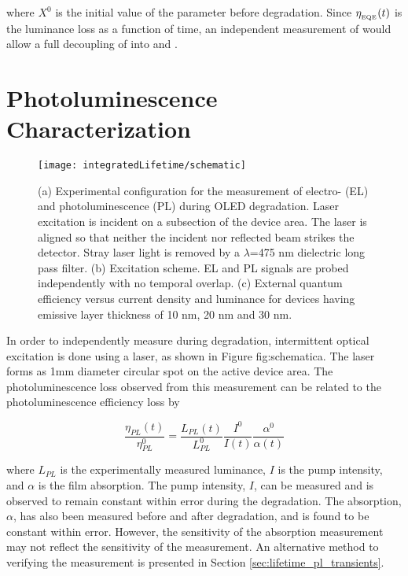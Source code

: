 \documentclass[../thesis.tex]{subfiles}
\begin{document}
where $X^0$ is the initial value of the parameter before degradation.
Since $\eta_{_\text{\tiny EQE}}(t)$ is the luminance loss as a function of time, an independent measurement of \pl would allow a full decoupling of \eqe into \pl and \ef.

\section{Photoluminescence Characterization}
\begin{figure}[ht]
\centering
\texttt{[image: integratedLifetime/schematic]}
\caption{(a) Experimental configuration for the measurement of electro- (EL) and photoluminescence (PL) during OLED degradation.  Laser excitation is incident on a subsection of the device area.  The laser is aligned so that neither the incident nor reflected beam strikes the detector.  Stray laser light is removed by a $\lambda$=475 nm dielectric long pass filter.  (b) Excitation scheme.  EL and PL signals are probed independently with no temporal overlap.  (c) External quantum efficiency versus current density and luminance for devices having emissive layer thickness of 10 nm, 20 nm and 30 nm.}
\label{fig:schematic}
\end{figure}

In order to independently measure \pl during degradation, intermittent optical excitation is done using a laser, as shown in Figure {fig:schematic}a.
The laser forms as 1mm diameter circular spot on the active device area.
The photoluminescence loss observed from this measurement can be related to the photoluminescence efficiency loss by

\begin{equation}
\frac{\eta_{PL}(t)}{\eta_{PL}^0}=\frac{L_{PL}(t)}{L_{PL}^0}\frac{I^0}{I(t)}\frac{\alpha^0}{\alpha(t)}
\label{eqn:pl_decay}
\end{equation}


where $L_{PL}$ is the experimentally measured luminance, $I$ is the pump intensity, and $\alpha$ is the film absorption.
The pump intensity, $I$, can be measured and is observed to remain constant within error during the degradation.
The absorption, $\alpha$, has also been measured before and after degradation, and is found to be constant within error.
However, the sensitivity of the absorption measurement may not reflect the sensitivity of the \pl measurement.
An alternative method to verifying the \pl measurement is presented in Section \ref{sec:lifetime_pl_transients}.
\end{document}
